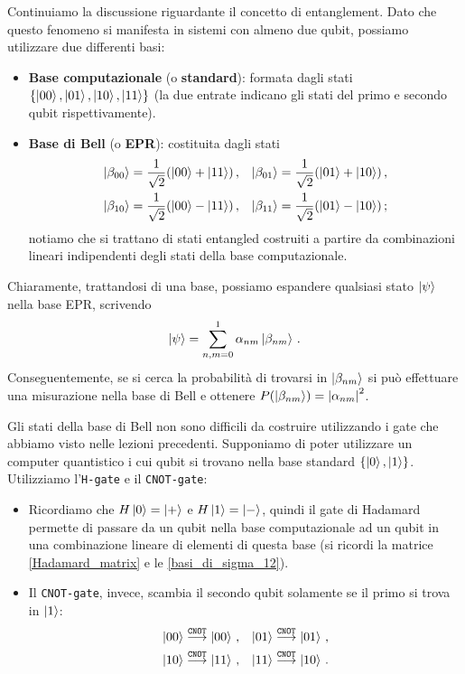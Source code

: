Continuiamo la discussione riguardante il concetto di entanglement. Dato che questo fenomeno si manifesta in sistemi con almeno due qubit, possiamo utilizzare due differenti basi:
\begin{itemize}
    \item \textbf{Base computazionale} (o \textbf{standard}): formata dagli stati $\lbrace \ket{00}, \ket{01}, \ket{10}, \ket{11} \rbrace$ (la due entrate indicano gli stati del primo e secondo qubit rispettivamente).
    
    \item \textbf{Base di Bell} (o \textbf{EPR}): costituita dagli stati 
    \begin{align*}
        \ket{\beta_{00}} &= \frac{1}{\sqrt{2}} (\ket{00} + \ket{11}) \, , &\ket{\beta_{01}} &= \frac{1}{\sqrt{2}} (\ket{01} + \ket{10}) \, , \\
        \ket{\beta_{10}} &= \frac{1}{\sqrt{2}} (\ket{00} - \ket{11}) \, , &\ket{\beta_{11}} &= \frac{1}{\sqrt{2}} (\ket{01} - \ket{10}) \, ;
    \end{align*}
    notiamo che si trattano di stati entangled costruiti a partire da combinazioni lineari indipendenti degli stati della base computazionale.
\end{itemize}

\noindent Chiaramente, trattandosi di una base, possiamo espandere qualsiasi stato $\ket{\psi}$ nella base EPR, scrivendo
\begin{equation*}
    \ket{\psi} = \sum_{n,m=0}^1 \alpha_{nm} \ket{\beta_{nm}} \, .
\end{equation*}
Conseguentemente, se si cerca la probabilità di trovarsi in $\ket{\beta_{nm}}$ si può effettuare una misurazione nella base di Bell e ottenere $P(\ket{\beta_{nm}}) = \abs{\alpha_{nm}}^2$. 

\noindent Gli stati della base di Bell non sono difficili da costruire utilizzando i gate che abbiamo visto nelle lezioni precedenti. Supponiamo di poter utilizzare un computer quantistico i cui qubit si trovano nella base standard $\lbrace \ket{0}, \ket{1} \rbrace$. Utilizziamo l'\texttt{H-gate} e il \texttt{CNOT-gate}: 
\begin{itemize}
    \item Ricordiamo che $H\ket{0} = \ket{+}$ e $H \ket{1} = \ket{-}$, quindi il gate di Hadamard permette di passare da un qubit nella base computazionale ad un qubit in una combinazione lineare di elementi di questa base (si ricordi la matrice \eqref{Hadamard_matrix} e le \eqref{basi_di_sigma_12}). 
    
    \item Il \texttt{CNOT-gate}, invece, scambia il secondo qubit solamente se il primo si trova in $\ket{1}$:
    \begin{align*}
    \ket{00} &\overset{\texttt{CNOT}}{\longrightarrow} \ket{00} \, , &\ket{01} &\overset{\texttt{CNOT}}{\longrightarrow} \ket{01} \, , \\
    \ket{10} &\overset{\texttt{CNOT}}{\longrightarrow} \ket{11} \, , &\ket{11} &\overset{\texttt{CNOT}}{\longrightarrow} \ket{10} \, .
\end{align*}
\end{itemize}

